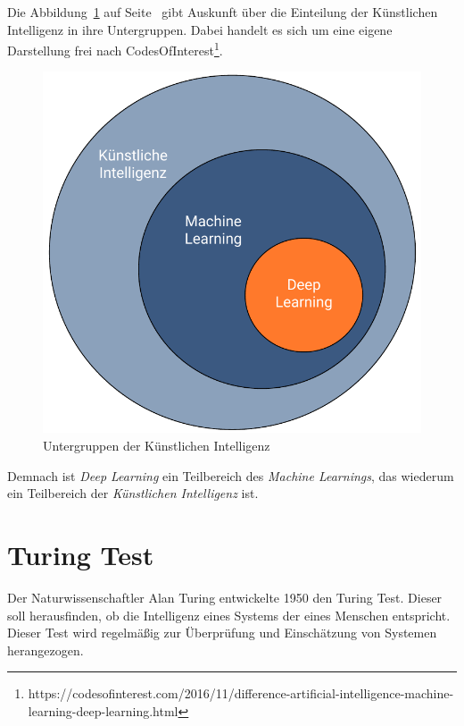 Die Abbildung~\ref{fig:grundlagen_artificialintelligence} auf Seite~\pageref{fig:grundlagen_artificialintelligence} gibt
Auskunft über die Einteilung der Künstlichen Intelligenz in ihre Untergruppen. Dabei handelt es sich um eine eigene
Darstellung frei nach CodesOfInterest\footnote{https://codesofinterest.com/2016/11/difference-artificial-intelligence-machine-learning-deep-learning.html}.

\begin{figure}[h]
    \centering
    \includegraphics[scale=0.55]{images/kapitel_2/kuenstliche_intelligenz.pdf}
    \caption{Untergruppen der Künstlichen Intelligenz}
    \label{fig:grundlagen_artificialintelligence}
\end{figure}

Demnach ist \textit{Deep Learning} ein Teilbereich des \textit{Machine Learnings}, das wiederum ein Teilbereich der
\textit{Künstlichen Intelligenz} ist.

\section{Turing Test}
Der Naturwissenschaftler Alan Turing entwickelte 1950 den Turing Test. Dieser soll herausfinden, ob die Intelligenz eines
Systems der eines Menschen entspricht. Dieser Test wird regelmäßig zur Überprüfung und Einschätzung von Systemen
herangezogen.

